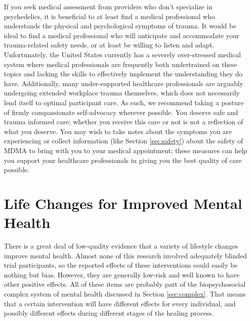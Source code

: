\documentclass[12pt,letterpaper]{book}
\begin{document}
If you seek medical assessment from providers who don't specialize in psychedelics, it is beneficial to at least find a medical professional who understands the physical and psychological symptoms of trauma. It would be ideal to find a medical professional who will anticipate and accommodate your trauma-related safety needs, or at least be willing to listen and adapt. Unfortunately, the United States currently has a severely over-stressed medical system where medical professionals are frequently both undertrained on these topics and lacking the skills to effectively implement the understanding they do have. Additionally, many under-supported healthcare professionals are arguably undergoing extended workplace trauma themselves, which does not necessarily lend itself to optimal participant care. As such, we recommend taking a posture of firmly compassionate self-advocacy wherever possible. You deserve safe and trauma informed care; whether you receive this care or not is not a reflection of what you deserve. You may wish to take notes about the symptoms you are experiencing or collect information (like Section \ref{sec:safety}) about the safety of MDMA to bring with you to your medical appointment; these measures can help you support your healthcare professionals in giving you the best quality of care possible.
\section{Life Changes for Improved Mental Health}
\label{sec:lifechanges}
There is a great deal of low-quality evidence that a variety of lifestyle changes improve mental health. Almost none of this research involved adequately blinded trial participants, so the reported effects of these interventions could easily be nothing but bias. However, they are generally low-risk and well known to have other positive effects. All of these items are probably part of the biopsychosocial complex system of mental health discussed in Section \ref{sec:complex}. That means that a certain intervention will have different effects for every individual, and possibly different effects during different stages of the healing process.
\end{document}
